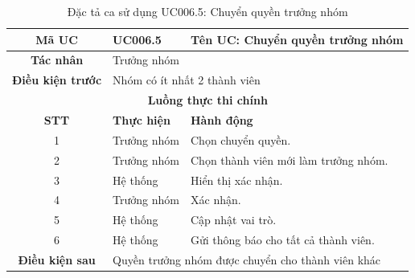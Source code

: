 \begin{table}[H]
    \centering
    \label{tab:uc006-5}
    \begin{tabularx}{\textwidth}{|c|p{3.5cm}|X|}
        \hline
        \rowcolor{headergreen} 
        \textbf{Mã UC} & \textbf{UC006.5} & \textbf{Tên UC: Chuyển quyền trưởng nhóm} \\ \hline
        \textbf{Tác nhân} & \multicolumn{2}{l|}{Trưởng nhóm} \\ \hline
        \textbf{Điều kiện trước} & \multicolumn{2}{X|}{Nhóm có ít nhất 2 thành viên} \\ \hline
        
        \multicolumn{3}{|c|}{\cellcolor{headerorange}\textbf{Luồng thực thi chính}} \\ \hline
        \rowcolor{graybg} \textbf{STT} & \textbf{Thực hiện} & \textbf{Hành động} \\ \hline
        1 & Trưởng nhóm & Chọn chuyển quyền. \\ \hline
        2 & Trưởng nhóm & Chọn thành viên mới làm trưởng nhóm. \\ \hline
        3 & Hệ thống & Hiển thị xác nhận. \\ \hline
        4 & Trưởng nhóm & Xác nhận. \\ \hline
        5 & Hệ thống & Cập nhật vai trò. \\ \hline
        6 & Hệ thống & Gửi thông báo cho tất cả thành viên. \\ \hline
        
        \textbf{Điều kiện sau} & \multicolumn{2}{X|}{Quyền trưởng nhóm được chuyển cho thành viên khác} \\ \hline
    \end{tabularx}
    \caption{Đặc tả ca sử dụng UC006.5: Chuyển quyền trưởng nhóm}
\end{table}


